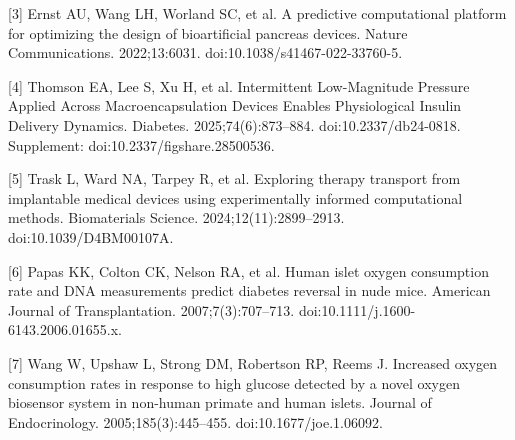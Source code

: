 \documentclass[11pt]{article}
\begin{document}
\begin{minipage}{\linewidth}
\par\noindent\begin{minipage}{\linewidth}\small [3] Ernst AU, Wang LH, Worland SC, et al. A predictive computational platform for optimizing the design of bioartificial pancreas devices. Nature Communications. 2022;13:6031. doi:10.1038/s41467-022-33760-5.\end{minipage}\par\vspace{2pt}

\par\noindent\begin{minipage}{\linewidth}\small [4] Thomson EA, Lee S, Xu H, et al. Intermittent Low-Magnitude Pressure Applied Across Macroencapsulation Devices Enables Physiological Insulin Delivery Dynamics. Diabetes. 2025;74(6):873--884. doi:10.2337/db24-0818. Supplement: doi:10.2337/figshare.28500536.\end{minipage}\par\vspace{2pt}

\par\noindent\begin{minipage}{\linewidth}\small [5] Trask L, Ward NA, Tarpey R, et al. Exploring therapy transport from implantable medical devices using experimentally informed computational methods. Biomaterials Science. 2024;12(11):2899--2913. doi:10.1039/D4BM00107A.\end{minipage}\par\vspace{2pt}

\par\noindent\begin{minipage}{\linewidth}\small [6] Papas KK, Colton CK, Nelson RA, et al. Human islet oxygen consumption rate and DNA measurements predict diabetes reversal in nude mice. American Journal of Transplantation. 2007;7(3):707--713. doi:10.1111/j.1600-6143.2006.01655.x.\end{minipage}\par\vspace{2pt}

\par\noindent\begin{minipage}{\linewidth}\small [7] Wang W, Upshaw L, Strong DM, Robertson RP, Reems J. Increased oxygen consumption rates in response to high glucose detected by a novel oxygen biosensor system in non-human primate and human islets. Journal of Endocrinology. 2005;185(3):445--455. doi:10.1677/joe.1.06092.\end{minipage}\par\vspace{2pt}


\end{minipage}
\end{document}
